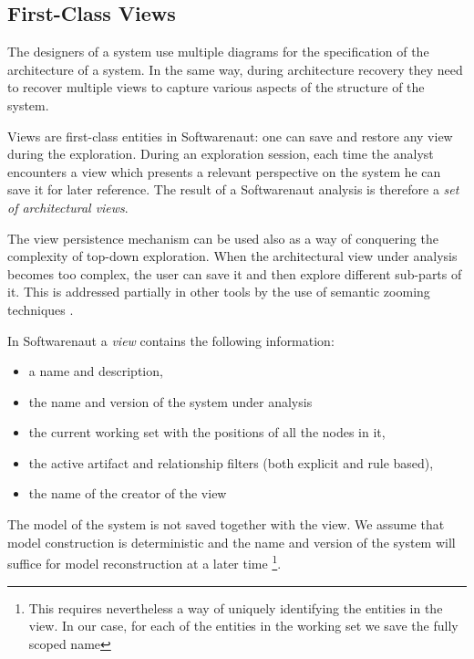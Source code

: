 \documentclass[preprint,12pt]{elsarticle}
\begin{document}
\subsection {First-Class Views}
The designers of a system use multiple diagrams for the specification of the architecture of a system. In the same way, during architecture recovery they need to recover multiple views to capture various aspects of the structure of the system. 

Views are first-class entities in Softwarenaut: one can save and restore any view during the exploration. During an exploration session, each time the analyst encounters a view which presents a relevant perspective on the system he can save it for later reference. The result of a Softwarenaut analysis is therefore a {\em set of architectural views}.

The view persistence mechanism can be used also as a way of conquering the complexity of top-down exploration. When the architectural view under analysis becomes too complex, the user can save it and then explore different sub-parts of it. This is addressed partially in other tools by the use of semantic zooming techniques \cite{storey-shrimp}. 

In Softwarenaut a {\em view} contains the following information: 
\begin{itemize}
\item a name and description,
\item the name and version of the system under analysis
\item the current working set with the positions of all the nodes in it,
\item the active artifact and relationship filters (both explicit and rule based), 
\item the name of the creator of the view
\end{itemize}

The model of the system is not saved together with the view. We assume that model construction is deterministic and the name and version of the system will suffice for model reconstruction at a later time \footnote{This requires nevertheless a way of uniquely identifying the entities in the view. In our case, for each of the entities in the working set we save the fully scoped name}.



\end{document}
